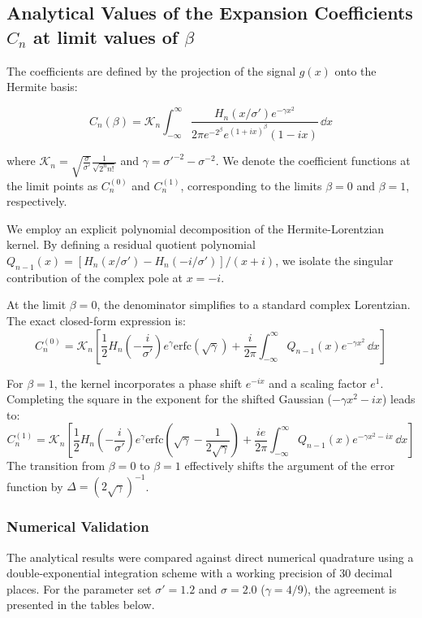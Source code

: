 \subsection{Analytical Values of the Expansion Coefficients $C_n$ at limit values of $\beta$}
\label{ss:analytic}
The coefficients are defined by the projection of the signal $g(x)$ onto the Hermite basis:

\begin{equation}
    C_n(\beta) = \mathcal{K}_n \int_{-\infty}^{\infty} \frac{H_n(x/\sigma') e^{-\gamma x^2}}{2\pi e^{-2^\beta} e^{(1+ix)^\beta} (1-ix)} \, \dd x
\end{equation}

where $\mathcal{K}_n = \sqrt{\frac{\sigma}{\sigma'}} \frac{1}{\sqrt{2^n n!}}$ and $\gamma = \sigma'^{-2} - \sigma^{-2}$. We denote the coefficient functions at the limit points as $C_n^{(0)}$ and $C_n^{(1)}$, corresponding to the limits $\beta=0$ and $\beta=1$, respectively.

We employ an explicit polynomial decomposition of the Hermite-Lorentzian kernel. By defining a residual quotient polynomial $Q_{n-1}(x) = [H_n(x/\sigma') - H_n(-i/\sigma')] / (x + i)$, we isolate the singular contribution of the complex pole at $x = -i$.

At the limit $\beta = 0$, the denominator simplifies to a standard complex Lorentzian. The exact closed-form expression is:
\begin{equation}
    C_n^{(0)} = \mathcal{K}_n \left[ \frac{1}{2} H_n\left(-\frac{i}{\sigma'}\right) e^\gamma \text{erfc}(\sqrt{\gamma}) + \frac{i}{2\pi} \int_{-\infty}^{\infty} Q_{n-1}(x) e^{-\gamma x^2} \, \dd x \right]
\end{equation}

For $\beta = 1$, the kernel incorporates a phase shift $e^{-ix}$ and a scaling factor $e^1$. Completing the square in the exponent for the shifted Gaussian ($-\gamma x^2 - ix$) leads to:
\begin{equation}
    C_n^{(1)} = \mathcal{K}_n \left[ \frac{1}{2} H_n\left(-\frac{i}{\sigma'}\right) e^\gamma \text{erfc}\left(\sqrt{\gamma} - \frac{1}{2\sqrt{\gamma}}\right) + \frac{ie}{2\pi} \int_{-\infty}^{\infty} Q_{n-1}(x) e^{-\gamma x^2 - ix} \, \dd x \right]
\end{equation}
The transition from $\beta=0$ to $\beta=1$ effectively shifts the argument of the error function by $\Delta = (2\sqrt{\gamma})^{-1}$.




\subsubsection{Numerical Validation}
The analytical results were compared against direct numerical quadrature using a double-exponential integration scheme with a working precision of 30 decimal places. For the parameter set $\sigma' = 1.2$ and $\sigma = 2.0$ ($\gamma = 4/9$), the agreement is presented in the tables below.





